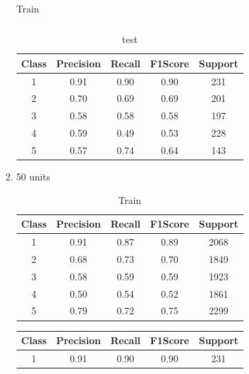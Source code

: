 \begin{enumerate}[label=(\alph*)]
\begin{enumerate}[label=\roman*.]
\begin{table}[!htb]
\begin{tabular}{ccccc}
            \end{tabular}
            \caption{Train}
            \label{part b train depth 10}
        \end{table}
        \begin{table}[!htb]
            \centering
            \begin{tabular}{ccccc}
            \hline
            Class & Precision & Recall & F1Score & Support \\ \hline
            1     & 0.91      & 0.90   & 0.90    & 231     \\
            2     & 0.70      & 0.69   & 0.69    & 201     \\
            3     & 0.58      & 0.58   & 0.58    & 197     \\
            4     & 0.59      & 0.49   & 0.53    & 228     \\
            5     & 0.57      & 0.74   & 0.64    & 143     \\ \hline
            \end{tabular}
            \caption{test}
            \label{part b test depth 10}
        \end{table}
        \item 50 units
        \begin{table}[!htb]
            \centering
            \begin{tabular}{ccccc}
            \hline
            Class & Precision & Recall & F1Score & Support \\ \hline
            1     & 0.91      & 0.87   & 0.89    & 2068    \\
            2     & 0.68      & 0.73   & 0.70    & 1849    \\
            3     & 0.58      & 0.59   & 0.59    & 1923    \\
            4     & 0.50      & 0.54   & 0.52    & 1861    \\
            5     & 0.79      & 0.72   & 0.75    & 2299    \\ \hline
            \end{tabular}
            \caption{Train}
            \label{part b train depth 50}
        \end{table}
        \begin{table}[!htb]
            \centering
            \begin{tabular}{ccccc}
            \hline
            Class & Precision & Recall & F1Score & Support \\ \hline
            1     & 0.91      & 0.90   & 0.90    & 231     \\

\end{tabular}
\end{table}
\end{enumerate}
\end{enumerate}
